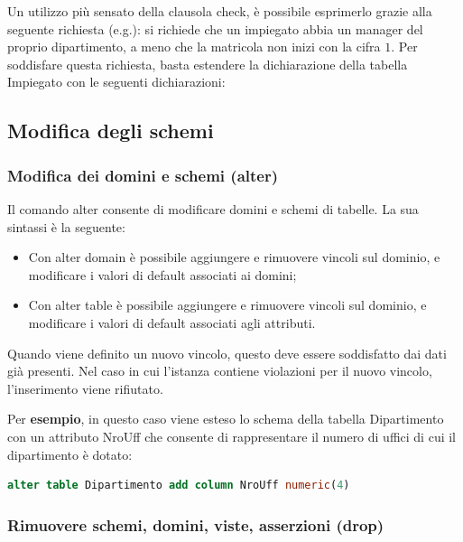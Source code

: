 \documentclass[a4paper]{article}
\begin{document}
	\noindent
	Un utilizzo più sensato della clausola \textsf{check}, è possibile esprimerlo grazie alla seguente richiesta (e.g.): si richiede che un impiegato abbia un manager del proprio dipartimento, a meno che la matricola non inizi con la cifra $1$. Per soddisfare questa richiesta, basta estendere la dichiarazione della tabella Impiegato con le seguenti dichiarazioni:
	\newpage
	
	\subsection{Modifica degli schemi}
	
	\subsubsection{Modifica dei domini e schemi (\textsf{alter})}
	
	Il comando \textsf{alter} consente di modificare domini e schemi di tabelle. La sua sintassi è la seguente:
	
	\begin{itemize}
		\item Con \textsf{alter domain} è possibile aggiungere e rimuovere vincoli sul dominio, e modificare i valori di default associati ai domini;
		\item Con \textsf{alter table} è possibile aggiungere e rimuovere vincoli sul dominio, e modificare i valori di default associati agli attributi.
	\end{itemize}
	Quando viene definito un nuovo vincolo, questo deve essere soddisfatto dai dati già presenti. Nel caso in cui l'istanza contiene violazioni per il nuovo vincolo, l'inserimento viene rifiutato.\newline
	
	\noindent
	Per \textcolor{Green4}{\textbf{esempio}}, in questo caso viene esteso lo schema della tabella Dipartimento con un attributo \textsf{NroUff} che consente di rappresentare il numero di uffici di cui il dipartimento è dotato:
\begin{lstlisting}[language=SQL]
alter table Dipartimento add column NroUff numeric(4)\end{lstlisting}\newpage
	
	\subsubsection{Rimuovere schemi, domini, viste, asserzioni (\textsf{drop})}\label{par: drop}
	
\end{document}
